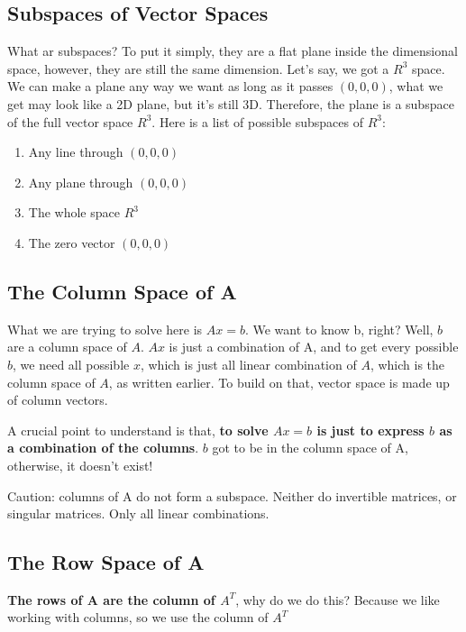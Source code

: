 \subsection{Subspaces of Vector Spaces}

What ar subspaces? To put it simply, they are a flat plane inside the dimensional space, however, they are still the same dimension. Let's say, we got a \(R^3\) space. We can make a plane any way we want as long as it passes \((0, 0, 0)\), what we get may look like a 2D plane, but it's still 3D. Therefore, the plane is a subspace of  the full vector space \(R^3\).
\newline
Here is a list of possible subspaces of \(R^3\):
\begin{enumerate}
    \item Any line through \((0, 0, 0)\)
    \item Any plane through \((0, 0, 0)\)
    \item The whole space \(R^3\) 
    \item The zero vector \((0, 0, 0)\) 
\end{enumerate}

\subsection{The Column Space of A}

What we are trying to solve here is \(Ax = b\). We want to know b, right? Well, \(b\)  are a column space of \(A\). \(Ax\) is just a combination of A, and to get every possible \(b\), we need all possible \(x\), which is just all linear combination of \(A\), which is the column space of \(A\), as written earlier. To build on that, vector space is made up of column vectors.       

A crucial point to understand is that, \textbf{to solve \(Ax = b\) is just to express \(b\) as a combination of the columns}. \(b\) got to be in the column space of A, otherwise, it doesn't exist!

Caution: columns of A do not form a subspace. Neither do invertible matrices, or singular matrices. Only all linear combinations.

\subsection{The Row Space of A}

\textbf{The rows of A are the column of \(A^T\)}, why do we do this?
Because we like working with columns, so we use the column of \(A^T\)

